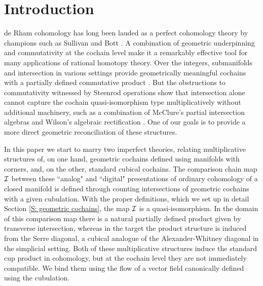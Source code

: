 

\section{Introduction} \label{S: intro}

de Rham cohomology has long been lauded as a perfect cohomology theory by champions such as Sullivan \cite{sullivan1977infinitesimal} and Bott \cite{BoTu82}.
A combination of geometric underpinning and commutativity at the cochain level make it a remarkably effective tool for many applications of rational homotopy theory.
Over the integers, submanifolds and intersection in various settings provide geometrically meaningful cochains \cite{Lipy14} with a partially defined commutative 
product \cite{Joyc15, FMS-foundations}.
But the obstructions to commutativity witnessed by Steenrod operations show that intersection alone cannot capture the cochain quasi-isomorphism type multiplicatively without additional machinery, such as a combination of McClure’s partial intersection algebras \cite{McCl06} and Wilson’s algebraic rectification \cite{Wils10}. One of our goals is to provide a more direct geometric reconciliation of these structures. 

In this paper we start to marry two imperfect theories, relating multiplicative structures of, on one hand, geometric cochains defined using manifolds with corners, and, on the other, standard cubical cochains.
The comparison chain map $\mathcal{I}$ between these ``analog" and ``digital" presentations of ordinary cohomology of a closed manifold is defined through counting intersections of geometric cochains with a given cubulation. With the proper definitions, which we set up in detail Section \ref{S: geometric cochains}, the map $\mathcal{I}$ is a quasi-isomorphism.
In the domain of this comparison map there is a natural partially defined product given by transverse intersection, whereas in the target the product structure is induced from the Serre diagonal, a cubical analogue of the Alexander-Whitney diagonal in the simplicial setting.
Both of these multiplicative structures induce the standard cup product in cohomology, but at the cochain level they are not immediately compatible.
We bind them using the flow of a vector field canonically defined using the cubulation.

